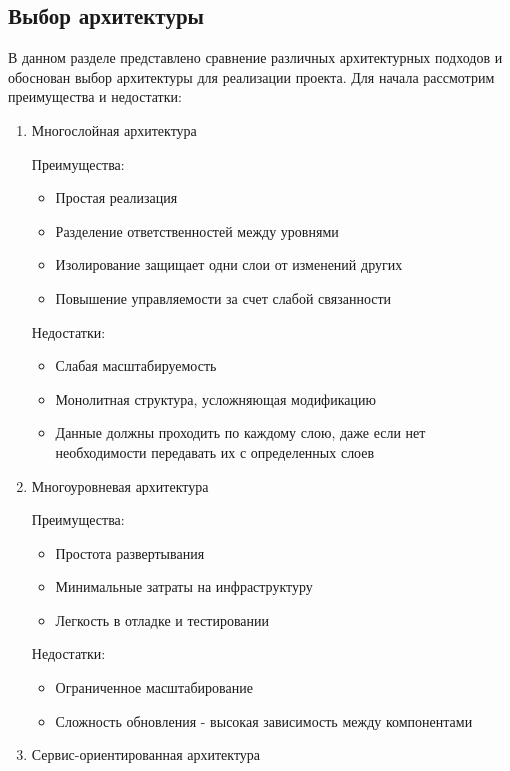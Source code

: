 \documentclass[utf8, russian]{eskdtext}
\begin{document}
\subsection{Выбор архитектуры}
 
 В данном разделе представлено сравнение различных архитектурных подходов и обоснован выбор архитектуры для реализации проекта. Для начала рассмотрим преимущества и недостатки:
 
 \begin{enumerate}
 \item{ Многослойная архитектура}
 
 Преимущества:
 \begin{itemize}
     \item Простая реализация
     \item Разделение ответственностей между уровнями
     \item Изолирование защищает одни слои от изменений других
     \item Повышение управляемости за счет слабой связанности
 \end{itemize}
 
 Недостатки:
 \begin{itemize}
     \item Слабая масштабируемость
     \item Монолитная структура, усложняющая модификацию
     \item Данные должны проходить по каждому слою, даже если нет необходимости передавать их с определенных слоев
 \end{itemize}
 
 \item{ Многоуровневая архитектура}
 
 Преимущества:
 \begin{itemize}
     \item Простота развертывания
     \item Минимальные затраты на инфраструктуру
     \item Легкость в отладке и тестировании
 \end{itemize}
 
 Недостатки:
 \begin{itemize}
     \item Ограниченное масштабирование
     \item Сложность обновления - высокая зависимость между компонентами
 \end{itemize}
 
 \item{ Сервис-ориентированная архитектура}
 

\end{enumerate}
\end{document}
